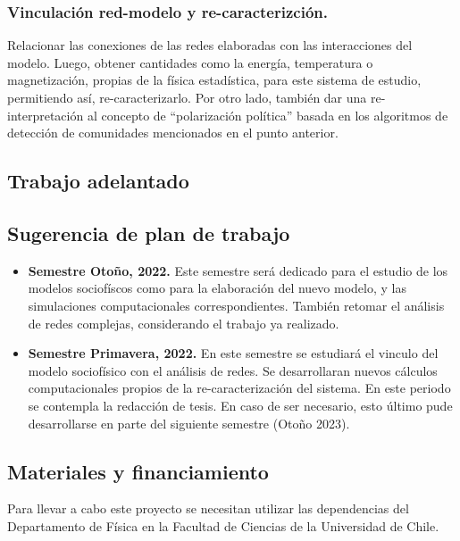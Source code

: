 \documentclass{proyectotesis}
\begin{document}
\subsubsection{Vinculación red-modelo y re-caracterizción.} Relacionar las conexiones de las redes elaboradas con las interacciones del modelo. Luego, obtener cantidades como la energía, temperatura o magnetización, propias de la física estadística, para este sistema de estudio, permitiendo así, re-caracterizarlo. Por otro lado, también dar una re-interpretación al concepto de ``polarización política''  basada en los algoritmos de detección de comunidades mencionados en el punto anterior. 
\subsection{Trabajo adelantado}

\subsection{Sugerencia de plan de trabajo}
\begin{itemize}
\item \textbf{Semestre Otoño, 2022.} Este semestre será dedicado para el estudio de los modelos sociofíscos como para la elaboración del nuevo modelo, y las simulaciones computacionales correspondientes. También retomar el análisis de redes complejas, considerando el trabajo ya realizado.

\item \textbf{Semestre Primavera, 2022.} En este semestre se estudiará el vinculo del modelo sociofísico con el análisis de redes. Se desarrollaran nuevos cálculos computacionales propios de la re-caracterización del sistema. En este periodo se contempla la redacción de tesis. En caso de ser necesario, esto último pude desarrollarse en parte del siguiente semestre (Otoño 2023). 
\end{itemize}

\subsection{Materiales y financiamiento}

Para llevar a cabo este proyecto se necesitan utilizar las dependencias del Departamento de Física en la Facultad de Ciencias de la Universidad de Chile. %
\end{document}
